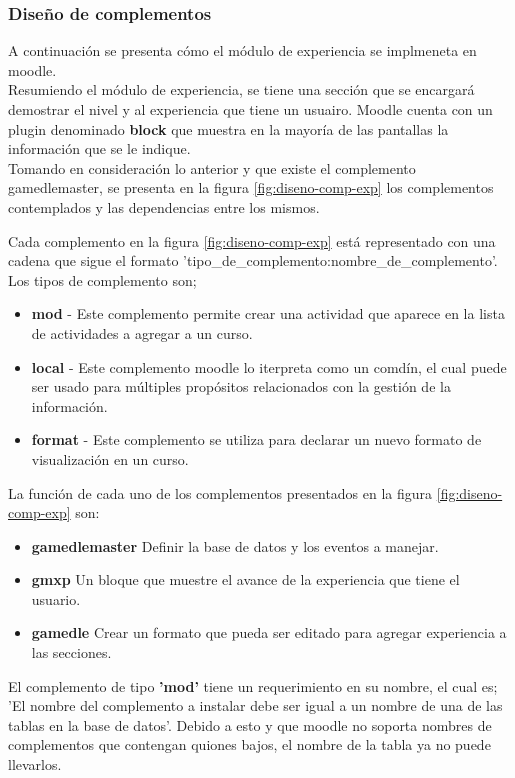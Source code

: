 

\subsubsection{Diseño de complementos}



A continuación se presenta cómo el módulo de experiencia
se implmeneta en moodle.\\


\noindent Resumiendo el módulo de experiencia, se tiene una sección que se encargará demostrar el nivel y al experiencia
que tiene un usuairo. Moodle cuenta con un plugin denominado \textbf{block} que muestra en la mayoría de las pantallas
la información que se le indique.\\

\noindent Tomando en consideración lo anterior y que existe el complemento gamedlemaster, se presenta en la figura \ref{fig:diseno-comp-exp}
los complementos contemplados y las dependencias entre los mismos.




Cada complemento en la figura \ref{fig:diseno-comp-exp} está representado con una cadena que sigue el formato 'tipo\_de\_complemento:nombre\_de\_complemento'. Los tipos de complemento son;
\begin{itemize}
    \item \textbf{mod} - Este complemento permite crear una actividad que aparece en la lista de actividades a agregar a un curso.
    \item \textbf{local} -  Este complemento moodle lo iterpreta como un comdín, el cual puede ser usado para múltiples propósitos relacionados con la gestión de la información.
    \item \textbf{format} -  Este complemento se utiliza para declarar un nuevo formato de visualización en un curso.
\end{itemize}

La función de cada uno de los complementos presentados en la figura \ref{fig:diseno-comp-exp} son:


\begin{itemize}
    \item \textbf{gamedlemaster} Definir la base de datos y los eventos a manejar.
    \item \textbf{gmxp} Un bloque que muestre el avance de la experiencia que tiene el usuario.
    \item \textbf{gamedle} Crear un formato que pueda ser editado para agregar experiencia a las secciones.
\end{itemize}

El complemento de tipo  \textbf{'mod'} tiene un requerimiento en su nombre, el cual es; 'El nombre del complemento a instalar debe ser igual a un nombre
de una de las tablas en la base de datos'. Debido a esto y que moodle no soporta nombres de complementos que contengan quiones bajos, el
nombre de la tabla ya no puede llevarlos.\\




